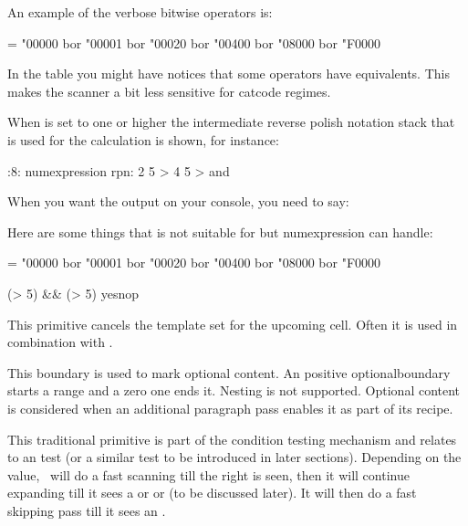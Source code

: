 An example of the verbose bitwise operators is:

\starttyping
\scratchcounter = \numexpression
    "00000 bor "00001 bor "00020 bor "00400 bor "08000 bor "F0000
\relax
\stoptyping

In the table you might have notices that some operators have equivalents. This
makes the scanner a bit less sensitive for catcode regimes.

When  is set to one or higher the intermediate \quote
{reverse polish notation} stack that is used for the calculation is shown, for
instance:

:8: {numexpression rpn: 2 5 > 4 5 > and}
\stoptyping

When you want the output on your console, you need to say:

\starttyping
{}
\stoptyping

Here are some things that  is not suitable for but \prm
{numexpression} can handle:

\starttyping
\scratchcounter = \numexpression
    "00000 bor "00001 bor "00020 bor "00400 bor "08000 bor "F0000
\relax

\ifcase \numexpression
    (\scratchcounterone > 5) && (\scratchcountertwo > 5)
\relax yes\else nop\fi
\stoptyping

\stopnewprimitive

\startoldprimitive[title={\prm {omit}}]

This primitive cancels the template set for the upcoming cell. Often it is used
in combination with .

\stopoldprimitive

\startnewprimitive[title={\prm {optionalboundary}}]

This boundary is used to mark optional content. An positive \prm
{optionalboundary} starts a range and a zero one ends it. Nesting is not
supported. Optional content is considered when an additional paragraph pass
enables it as part of its recipe.

\stopnewprimitive

\startoldprimitive[title={\prm {or}}]

This traditional primitive is part of the condition testing mechanism and relates
to an  test (or a similar test to be introduced in later
sections). Depending on the value, \TEX\ will do a fast scanning till the right
 is seen, then it will continue expanding till it sees a 
or  or  (to be discussed later). It will then do a
fast skipping pass till it sees an .

